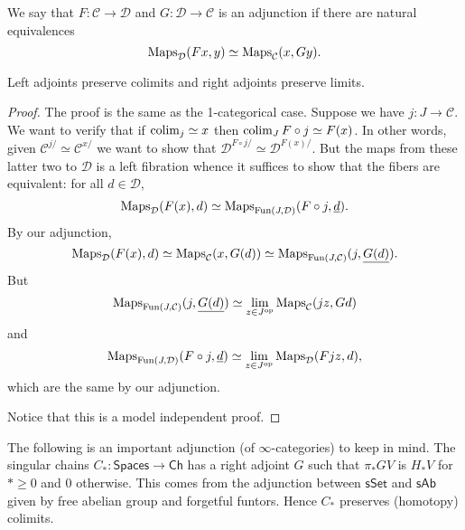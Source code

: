 \documentclass{amsart}
\DeclareMathOperator{\Fun}{Fun}
\begin{document}
\begin{definition}
    We say that $F:\mathcal{C}\to \mathcal{D}$ and $G:\mathcal{D}\to \mathcal{C}$ is an
    adjunction if there are natural equivalences
    \begin{equation*}
        \operatorname{Maps}_{\mathcal{D}}(Fx, y) \simeq \operatorname{Maps}_{\mathcal{C}}(x, Gy).
    \end{equation*}
\end{definition}

\begin{proposition}
    Left adjoints preserve colimits and right adjoints preserve limits.
\end{proposition}
\begin{proof}
    The proof is the same as the 1-categorical case. Suppose we have $j:J\to \mathcal{C}$.
    We want to verify that if $\operatorname*{colim}_j \simeq x$ then $\operatorname*{colim}_J F\circ j\simeq F(x)$.
    In other words, given $\mathcal{C}^{j/}\simeq \mathcal{C}^{x/}$ we want
    to show that $\mathcal{D}^{F\circ j/}\simeq \mathcal{D}^{F(x)/}$. But the maps
    from these latter two to $\mathcal{D}$ is a left fibration whence it suffices to
    show that the fibers are equivalent: for all $d\in\mathcal{D}$,
    \begin{equation*}
        \Maps_\mathcal{D}(F(x), d) \simeq \Maps_{\Fun(J,\mathcal{D})}(F\circ j, \underline{d}).
    \end{equation*}
    By our adjunction,
    \begin{equation*}
        \Maps_{\mathcal{D}}(F(x),d) \simeq \Maps_\mathcal{C}(x, G(d)) \simeq \Maps_{\Fun(J,\mathcal{C})}(j,\underline{G(d)}).
    \end{equation*}
    But
    \begin{equation*}
        \Maps_{\Fun(J,\mathcal{C})}(j,\underline{G(d)})\simeq \lim_{z\in J^{\text{op}}}\Maps_{\mathcal{C}}(jz, Gd)
    \end{equation*}
    and
    \begin{equation*}
        \Maps_{\Fun(J,\mathcal{D})}(F\circ j,\underline{d})\simeq \lim_{z\in J^\text{op}}\Maps_\mathcal{D}(Fjz, d),
    \end{equation*}
    which are the same by our adjunction.

    Notice that this is a model independent proof.
\end{proof}

The following is an important adjunction (of $\infty$-categories) to keep in mind.
The singular chains $C_*:\mathsf{Spaces}\to \mathsf{Ch}$ has a right
adjoint $G$ such that $\pi_*GV$ is $H_*V$ for $*\geq 0$ and 0 otherwise.
This comes from the adjunction between $\mathsf{sSet}$ and $\mathsf{sAb}$
given by free abelian group and forgetful funtors. Hence $C_*$ preserves
(homotopy) colimits. 
\end{document}
